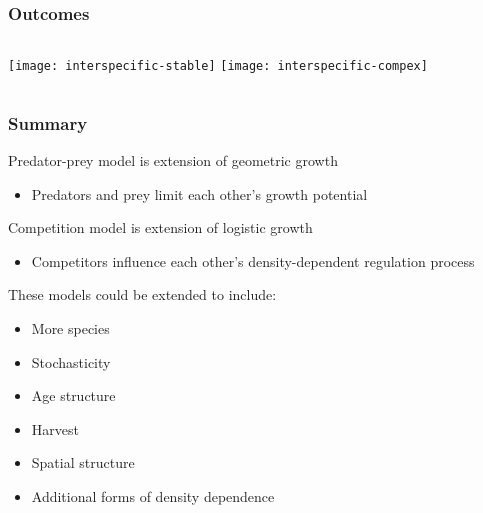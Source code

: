 \documentclass[color=usenames,dvipsnames]{beamer}\usepackage[]{graphicx}\usepackage[]{color}
\begin{document}




\begin{frame}
  \frametitle{Outcomes}
  \vspace{-1cm}


\begin{columns}
  \column{\dimexpr\paperwidth-10pt}
    \texttt{[image: interspecific-stable]}
    \texttt{[image: interspecific-compex]}
\end{columns}
\end{frame}



\begin{frame}
  \frametitle{Summary}
  \large
  Predator-prey model is extension of geometric growth
    \begin{itemize}
      \item Predators and prey limit each other's growth potential
    \end{itemize}
    \pause \vfill
    Competition model is extension of logistic growth
    \begin{itemize}
      \item Competitors influence each other's density-dependent
        regulation process
    \end{itemize}
    \pause \vfill
    These models could be extended to include:
    \begin{itemize}%
    \item More species
    \item Stochasticity
    \item Age structure
    \item Harvest
    \item Spatial structure
    \item Additional forms of density dependence
    \end{itemize}
\end{frame}
\end{document}

